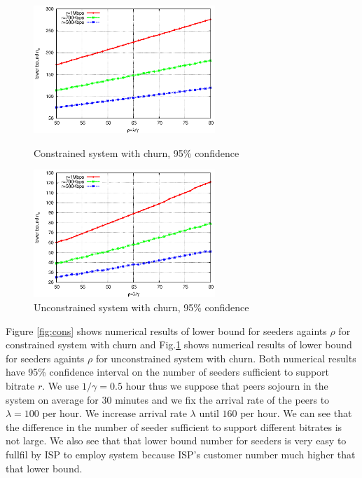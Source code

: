 \documentclass[paper]{ieice}
\begin{document}
\begin{figure}[ht]
\begin{minipage}[b]{0.4\linewidth}
\centering
\includegraphics[width=2.7in]{graphs/constrained.eps}
\caption{Constrained system with churn, 95\% confidence}
\label{fig:cons}
\end{minipage}
\hspace{0.5cm}
\begin{minipage}[b]{0.5\linewidth}
\centering
\includegraphics[width=2.7in]{graphs/unconstrained.eps}
\caption{Unconstrained system with churn, 95\% confidence}
\label{fig:uncons}
\end{minipage}
\end{figure}

Figure \ref{fig:cons} shows numerical results of lower bound for seeders againts $\rho$ for constrained system with churn and Fig.\ref{fig:uncons} shows numerical results of lower bound for seeders againts $\rho$ for unconstrained system with churn.  
Both numerical results have 95\% confidence interval on the number of seeders sufficient to support bitrate $r$.  
We use $1/\gamma = 0.5$ hour thus we suppose that peers sojourn in the system on average for 30 minutes and we fix the arrival rate of the peers to $\lambda=100$ per hour.
We increase arrival rate $\lambda$ until $160$ per hour. 
We can see that the difference in the number of seeder sufficient to support different bitrates is not large.  
We also see that that lower bound number for seeders is very easy to fullfil by ISP to employ system because ISP's customer number much higher that that lower bound.
\end{document}
